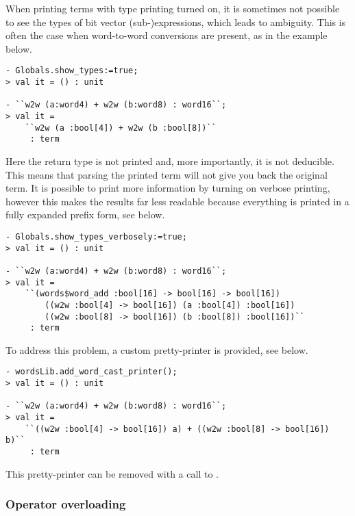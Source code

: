 When printing terms with type printing turned on, it is sometimes not possible to see the types of bit vector (sub-)expressions, which leads to ambiguity.  This is often the case when word-to-word conversions are present, as in the example below.
\begin{session}
\begin{verbatim}
- Globals.show_types:=true;
> val it = () : unit

- ``w2w (a:word4) + w2w (b:word8) : word16``;
> val it =
    ``w2w (a :bool[4]) + w2w (b :bool[8])``
     : term
\end{verbatim}
\end{session}
Here the return type \ty{:\bool[16]} is not printed and, more importantly, it is not deducible.  This means that parsing the printed term will not give you back the original term.  It is possible to print more information by turning on verbose printing, however this makes the results far less readable because everything is printed in a fully expanded prefix form, see below.
\begin{session}
\begin{verbatim}
- Globals.show_types_verbosely:=true;
> val it = () : unit

- ``w2w (a:word4) + w2w (b:word8) : word16``;
> val it =
    ``(words$word_add :bool[16] -> bool[16] -> bool[16])
        ((w2w :bool[4] -> bool[16]) (a :bool[4]) :bool[16])
        ((w2w :bool[8] -> bool[16]) (b :bool[8]) :bool[16])``
     : term
\end{verbatim}
\end{session}
To address this problem, a custom pretty-printer is provided, see below.
\begin{session}
\begin{verbatim}
- wordsLib.add_word_cast_printer();
> val it = () : unit

- ``w2w (a:word4) + w2w (b:word8) : word16``;
> val it =
    ``((w2w :bool[4] -> bool[16]) a) + ((w2w :bool[8] -> bool[16]) b)``
     : term
\end{verbatim}
\end{session}
This pretty-printer can be removed with a call to .

\subsubsection{Operator overloading}

